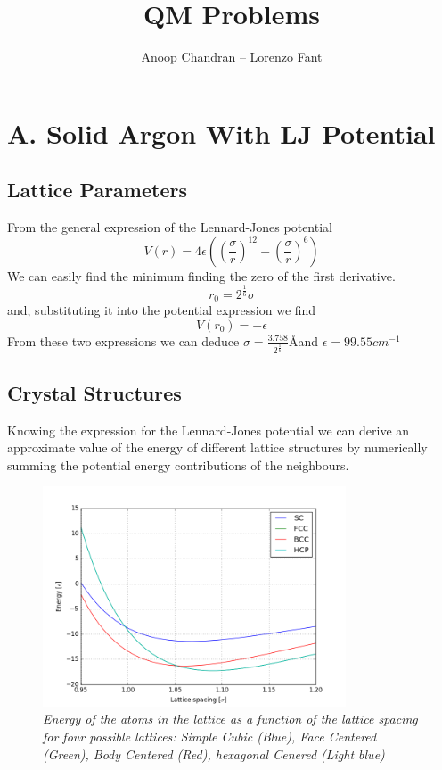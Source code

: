 \documentclass[a4paper]{article}
\title{QM Problems}
\author{Anoop Chandran -- Lorenzo Fant}
\begin{document}
\maketitle


\section{A. Solid Argon With LJ Potential}

\subsection{Lattice Parameters}
From the general expression of the Lennard-Jones potential
\begin{equation}
V(r) = 4\epsilon\left(\left(\frac{\sigma}{r}\right)^12-\left(\frac{\sigma}{r}\right)^6\right)
\end{equation}
We can easily find the minimum finding the zero of the first derivative.
\begin{equation}
r_0 = 2^{\frac{1}{6}}\sigma
\end{equation}
and, substituting it into the potential expression we find
\begin{equation}
V(r_0) = -\epsilon
\end{equation}
From these two expressions we can deduce $\sigma = \frac{3.758}{2^{\frac{1}{6}}}$\AA and $\epsilon = 99.55 cm^{-1}$
\subsection{Crystal Structures}
Knowing the expression for the Lennard-Jones potential we can derive an approximate value of the energy of different lattice structures by numerically summing the potential energy contributions of the neighbours.
\begin{figure}[h]
    \centering
    \includegraphics[width=9cm]{energy_lattice_spacing.png}
    \caption{\it \label{en(spacing)}Energy of the atoms in the lattice as a function of the lattice spacing for four possible lattices: Simple Cubic (Blue), Face Centered (Green), Body Centered (Red), hexagonal Cenered (Light blue)}
    \end{figure}
    
\end{document}
